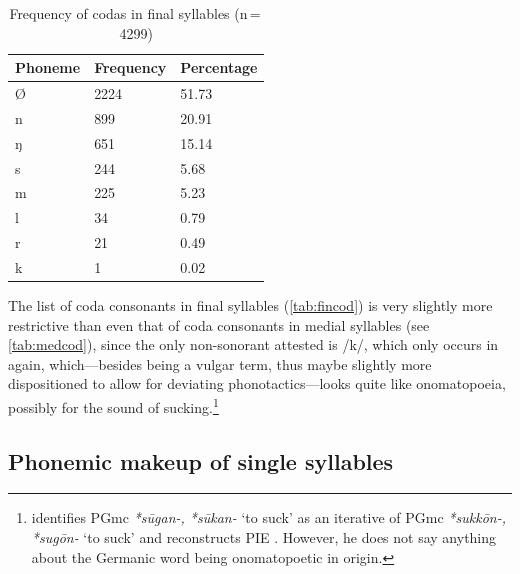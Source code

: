 \begin{table}[pth]\centering
\caption[Frequency of codas in final syllables]{Frequency of codas in final 
syllables (n\,=\,4299)}
\begin{tabu} to 0.5\linewidth{X X[c] X[c]}
\tableheaderfont\toprule
Phoneme
	& Frequency
	& Percentage
	\\
	
\toprule

Ø
	& 2224
	& 51.73\pct
	\\

\midrule

n
	& 899
	& 20.91\pct
	\\

ŋ
	& 651
	& 15.14\pct
	\\

s
	& 244
	& 5.68\pct
	\\

m
	& 225
	& 5.23\pct
	\\

l
	& 34
	& 0.79\pct
	\\

r
	& 21
	& 0.49\pct
	\\

k
	& 1
	& 0.02\pct
	\\

\bottomrule
\end{tabu}
\label{tab:fincod}
\end{table}

The list of coda consonants in final syllables (\autoref{tab:fincod}) is very 
slightly more restrictive than even that of coda consonants in medial syllables
(see \autoref{tab:medcod}), since the only non-sonorant attested is /k/, which 
only occurs in  again, which---besides being a 
vulgar term, thus maybe slightly more dispositioned to allow for deviating 
phonotactics---looks quite like onomatopoeia, possibly for the sound of 
sucking.\footnote{\citet[489--490]{kroonen2013} identifies PGmc \textit{*sūgan-,
*sūkan-} `to suck' as an iterative of PGmc \textit{*sukkōn-, *sugōn-} `to suck' 
and reconstructs PIE . However, he does not say 
anything about the Germanic word being onomatopoetic in origin.}
%

\subsection{Phonemic makeup of single syllables}

